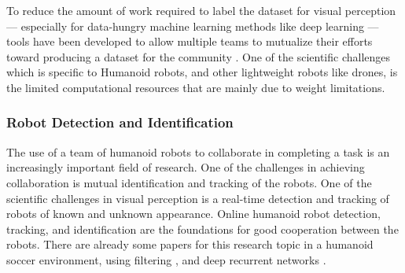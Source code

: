 \documentclass{article}
\begin{document}
To reduce the amount of work required to label the dataset for visual perception --- especially for data-hungry machine learning methods like deep learning --- tools have been developed to allow multiple teams to mutualize their efforts toward producing a dataset for the community \cite{imagetagger2018}.
One of the scientific challenges which is specific to Humanoid robots, and other lightweight robots like drones, is the limited computational resources that are mainly due to weight limitations. 




\subsubsection{Robot Detection and Identification}
The use of a team of humanoid robots to collaborate in completing a task is an increasingly important field of research. 
One of the challenges in achieving collaboration is mutual identification and tracking of the robots. One of the scientific challenges in visual perception is a real-time detection and tracking of robots of known and unknown appearance.
Online humanoid robot detection, tracking, and identification are the foundations for good cooperation between the robots. 
There are already some papers for this research topic in a humanoid soccer environment, using filtering \cite{farazi2016real}, and deep recurrent networks \cite{farazi2017online}.
\end{document}
